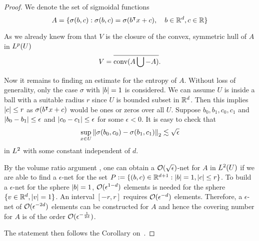\begin{proof}
    We denote the set of sigmoidal functions
    \begin{equation}
        A = \{\sigma(b,c): \sigma(b,c) = \sigma(b{}^{\intercal} x + c), \quad 
        b\in\mathbb{R}^d, c\in\mathbb{R}\}
    \end{equation}

    As we already knew from \cite{barronUniversalApproximationBounds1993} that
    $V$ is the closure of the convex, symmetric hull of $A$ in $L^{p}(U)$
    \begin{equation}
        V = \overline{\operatorname*{conv}(A \bigcup - A)}.
    \end{equation}
    
    Now it remains to finding an estimate for the entropy of $A$. Without loss
    of generality, only the case $\sigma$ with $\left| b \right| = 1$ is considered. We
    can assume $U$ is inside a ball with a suitable radius $r$ since $U$ is
    bounded subset in $\mathbb{R}^d$. Then this implies $\left| c \right| \leq r$ as $\sigma(b{}^{\intercal}
    x + c)$ would be ones or zeros over all $U$. Suppose $b_0, b_1, c_0, c_1$
    and $\left| b_0 - b_1 \right| \leq \epsilon$ and $\left| c_0 - c_1 \right| \leq \epsilon$ for
    some $\epsilon < 0$. It is easy to check that 
    \begin{equation}
        \sup_{x\in U} \left\| \sigma({b_0, c_0}) - \sigma({b_1, c_1}) \right\|_2
            \lesssim \sqrt{\epsilon}
    \end{equation}
    in $L^{2}$ with some constant independent of $d$.
    
    By the volume ratio argument
    \citep{vandervaartWeakConvergenceEmpirical1996}, one can obtain a
    $\mathcal{O}(\sqrt{\epsilon})$-net for $A$ in $L^{2}(U)$ if we are able to find a
    $\epsilon$-net for the set $P:= \{(b,c)\in \mathbb{R}^{d+1}: \left| b \right| = 1, \left| c \right|
    \leq r\}$. To build a $\epsilon$-net for the sphere $\left| b \right|=1$,
    $\mathcal{O}(\epsilon^{1-d})$ elements is needed for the sphere $\{v \in \mathbb{R}^d,
    \left| v \right|=1\}$. An interval $[-r,r]$ requires $\mathcal{O}(\epsilon^{-d})$ elements.
    Therefore, a $\epsilon$-net of $\mathcal{O}(\epsilon^{-2d})$ elements can be
    constructed for $A$ and hence the covering number for $A$ is of the order
    $\mathcal{O}(\epsilon^{-\frac{1}{2d}})$.

    The statement then follows the Corollary on~\cite[p.
    104]{makovozRandomApproximantsNeural1996}.



\end{proof}
